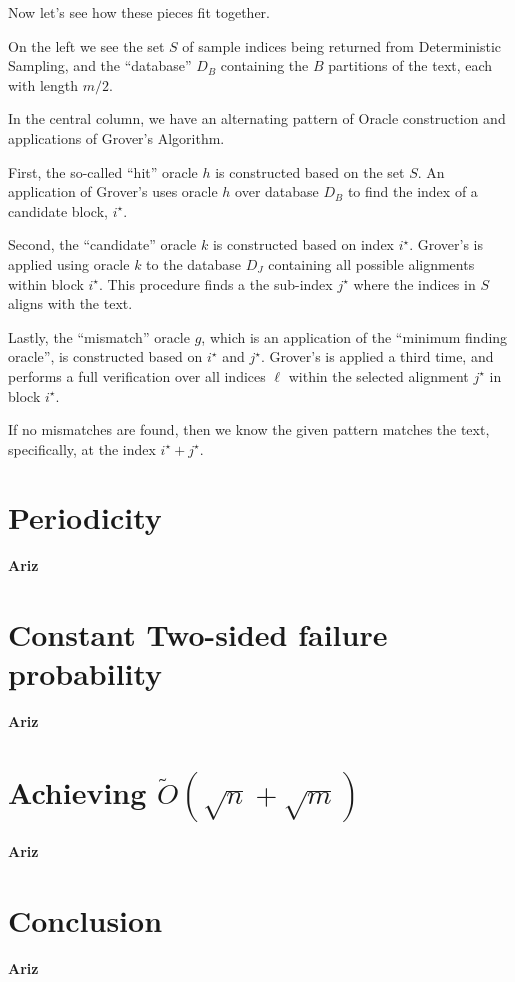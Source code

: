 \documentclass[11pt]{article}
\begin{document}
Now let's see how these pieces fit together.

On the left we see the set \(S\) of sample indices being returned from Deterministic Sampling, and the ``database'' \(D_B\) containing the \(B\) partitions of the text, each with length \(m/2\).

In the central column, we have an alternating pattern of Oracle construction and applications of Grover's Algorithm.

First, the so-called ``hit'' oracle \(h\) is constructed based on the set \(S\).
An application of Grover's uses oracle \(h\) over database \(D_B\) to find the index of a candidate block, \(i^\star\).

Second, the ``candidate'' oracle \(k\) is constructed based on index \(i^\star\). Grover's is applied using oracle \(k\) to the database \(D_J\) containing all possible alignments within block \(i^\star\). This procedure finds a the sub-index \(j^\star\) where the indices in \(S\) aligns with the text.

Lastly, the ``mismatch'' oracle \(g\), which is an application of the ``minimum finding oracle'', is constructed based on \(i^\star\) and \(j^\star\). Grover's is applied a third time, and performs a full verification over all indices \(\ell\) within the selected alignment \(j^\star\) in block \(i^\star\).

If no mismatches are found, then we know the given pattern matches the text, specifically, at the index \(i^\star + j^\star\).




\section*{Periodicity}
\textbf{Ariz} \linebreak
\section*{Constant Two-sided failure probability}
\textbf{Ariz} \linebreak
\section*{Achieving \(\tilde{O}(\sqrt{n} + \sqrt{m})\)}
\textbf{Ariz} \linebreak
\section*{Conclusion}
\textbf{Ariz} \linebreak
\end{document}
